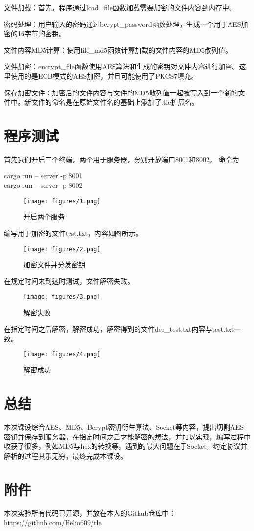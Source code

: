 \documentclass{ctexart}
\begin{document}
文件加载：首先，程序通过load\_file函数加载需要加密的文件内容到内存中。

密码处理：用户输入的密码通过bcrypt\_password函数处理，生成一个用于AES加密的16字节的密钥。

文件内容MD5计算：使用file\_md5函数计算加载的文件内容的MD5散列值。

文件加密：encrypt\_file函数使用AES算法和生成的密钥对文件内容进行加密。这里使用的是ECB模式的AES加密，并且可能使用了PKCS7填充。

保存加密文件：加密后的文件内容与文件的MD5散列值一起被写入到一个新的文件中。新文件的命名是在原始文件名的基础上添加了.tle扩展名。

\newpage
\section{程序测试}

首先我们开启三个终端，两个用于服务器，分别开放端口8001和8002。
命令为
\begin{center}
    cargo run -- server -p 8001 \\
    cargo run -- server -p 8002
\end{center}
\begin{figure}[htbp]
    \centering
    \texttt{[image: figures/1.png]}
    \caption{开启两个服务}
    \label{fig:t1}
\end{figure}

编写用于加密的文件test.txt，内容如图所示。
\begin{figure}[htbp]
    \centering
    \texttt{[image: figures/2.png]}
    \caption{加密文件并分发密钥}
    \label{fig:t2}
\end{figure}

\newpage
在规定时间未到达时测试，文件解密失败。
\begin{figure}[htbp]
    \centering
    \texttt{[image: figures/3.png]}
    \caption{解密失败}
    \label{fig:t3}
\end{figure}

在指定时间之后解密，解密成功，解密得到的文件dec\_test.txt内容与test.txt一致。
\begin{figure}[htbp]
    \centering
    \texttt{[image: figures/4.png]}
    \caption{解密成功}
    \label{fig:t4}
\end{figure}


\newpage
\section{总结}
本次课设综合AES、MD5、Bcrypt密钥衍生算法、Socket等内容，提出切割AES密钥并保存到服务器，在指定时间之后才能解密的想法，并加以实现，编写过程中收获了很多，例如MD5与hex的转换等，遇到的最大问题在于Socket，约定协议并解析的过程其乐无穷，最终完成本课设。

\newpage
\section{附件}

本次实验所有代码已开源，并放在本人的Github仓库中：https://github.com/Helio609/tle
\end{document}
